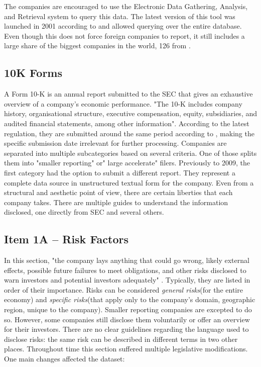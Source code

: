 \documentclass[12pt,MSc,a4paper,oneside]{muthesis}
\begin{document}
The companies are encouraged to use the Electronic Data Gathering, Analysis, and Retrieval system \cite{edgar-search} to query this data. The latest version of this tool was launched in 2001 according to \cite{edgar-search} and allowed querying over the entire database. Even though this does not force foreign companies to report, it still includes a large share of the biggest companies in the world, 126 from \cite{fortune-500-2021}.

\subsection{10K Forms}

A Form 10-K is an annual report submitted to the SEC that gives an exhaustive overview of a company's economic performance. "The 10-K includes company history, organisational structure, executive compensation, equity, subsidiaries, and audited financial statements, among other information"\cite{wiki:10k}. According to the latest regulation, they are submitted around the same period according to \cite{10k-general-rules}, making the specific submission date irrelevant for further processing. Companies are separated into multiple subcategories based on several criteria. One of those splits them into "smaller reporting" or" large accelerate" filers. Previously to 2009, the first category had the option to submit a different report. They represent a complete data source in unstructured textual form for the company. Even from a structural and aesthetic point of view, there are certain liberties that each company takes. There are multiple guides to understand the information disclosed, one directly from SEC and several others. 

\subsection{Item 1A – Risk Factors}

In this section, "the company lays anything that could go wrong, likely external effects, possible future failures to meet obligations, and other risks disclosed to warn investors and potential investors adequately" \cite{wiki:10k}. Typically, they are listed in order of their importance. Risks can be considered \textit{general risks}(for the entire economy) and \textit{specific risks}(that apply only to the company's domain, geographic region, unique to the company). Smaller reporting companies are excepted to do so. However, some companies still disclose them voluntarily or offer an overview for their investors. There are no clear guidelines regarding the language used to disclose risks: the same risk can be described in different terms in two other places.
Throughout time this section suffered multiple legislative modifications. One main changes affected the dataset:
\end{document}
